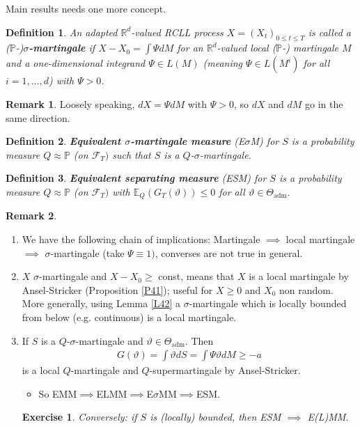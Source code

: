 \documentclass[12pt,a4paper, twoside]{article}
\newtheorem{defn}{Definition}[section]
\newtheorem{exe}{Exercise}[section]
\theoremstyle{definition}
\newtheorem{rem}{Remark}[section]
\newcommand{\EE}{\mathbb{E}} %
\newcommand{\PP}{\mathbb{P}} %
\begin{document}
Main results needs one more concept. 
\begin{defn} An adapted $\mathbb{R}^d$-valued RCLL process $X=(X_t)_{0 \leq t \leq T}$ is called a ($\PP$-)\textbf{$\sigma$-martingale} if $X-X_0 = \int \Psi dM$ for an $\mathbb{R}^d$-valued local ($\PP$-) martingale $M$ and a one-dimensional integrand $\Psi \in L(M)$ (meaning $\Psi \in L(M^i)$ for all $i=1, \dots , d$) with $\Psi >0$. 
\end{defn}
\begin{rem}Loosely speaking, $dX= \Psi dM$ with $\Psi >0$, so $dX$ and $dM$ go in the same direction. 
\end{rem}
\begin{defn} \textbf{Equivalent $\sigma$-martingale measure} (E$\sigma$M) for $S$ is a probability measure $Q \approx \PP$ (on $\mathcal{F}_T)$ such that $S$ is a $Q$-$\sigma$-martingale. 
\end{defn}
\begin{defn} \textbf{Equivalent separating measure} (ESM) for $S$ is a probability measure $Q \approx \PP$ (on $\mathcal{F}_T)$ with $\EE_Q(G_T( \vartheta)) \leq 0$ for all $\vartheta \in \Theta_\text{adm}$. 
\end{defn}
\begin{rem} \label{R55} \
\begin{enumerate}
\item We have the following chain of implications: Martingale $\implies$ local martingale $\implies$ $\sigma$-martingale (take $\Psi \equiv 1)$, converses are not true in general. 
\item $X$ $\sigma$-martingale and $X-X_0 \geq $ const, means that $X$ is a local martingale by Ansel-Stricker (Proposition \ref{P41}); useful for $X \geq 0$ and $X_0$ non random. More generally, using Lemma \ref{L42} a $\sigma$-martingale which is locally bounded from below (e.g. continuous) is a local martingale. 
\item If $S$ is a $Q$-$\sigma$-martingale and $\vartheta \in \Theta_\text{adm}$. Then
\begin{align*}
G( \vartheta) = \int \vartheta dS = \int \Psi \vartheta dM \geq - a
\end{align*}
is a local $Q$-martingale and $Q$-supermartingale by Ansel-Stricker. 
\begin{itemize}
\item So EMM$\implies$ELMM$\implies$E$\sigma$MM$\implies$ESM.
\end{itemize}
\begin{exe} Conversely: if $S$ is (locally) bounded, then ESM $\implies$ E(L)MM. 
\end{exe}
\end{enumerate}
\end{rem}
\end{document}
